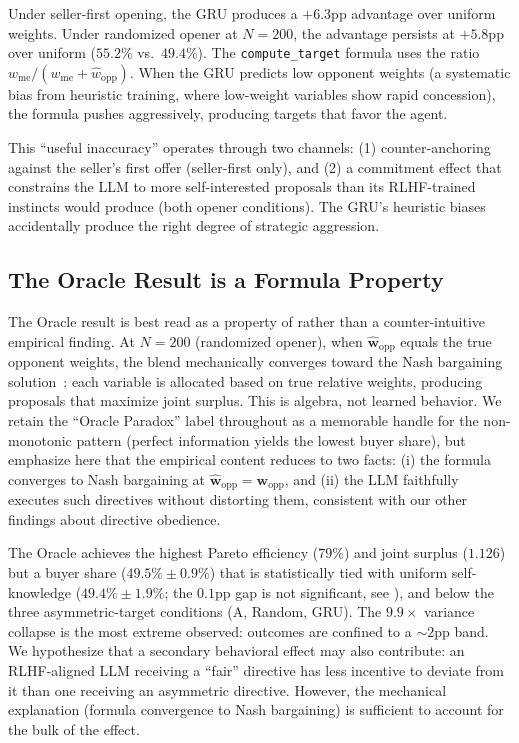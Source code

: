 \documentclass[11pt,a4paper]{article}
\begin{document}
Under seller-first opening, the GRU produces a $+6.3$pp advantage over uniform weights. Under randomized opener at $N = 200$, the advantage persists at $+5.8$pp over uniform ($55.2\%$ vs.\ $49.4\%$). The \texttt{compute\_target} formula uses the ratio $w_{\text{me}} / (w_{\text{me}} + \hat{w}_{\text{opp}})$. When the GRU predicts low opponent weights (a systematic bias from heuristic training, where low-weight variables show rapid concession), the formula pushes aggressively, producing targets that favor the agent.

This ``useful inaccuracy'' operates through two channels: (1) counter-anchoring against the seller's first offer (seller-first only), and (2) a commitment effect that constrains the LLM to more self-interested proposals than its RLHF-trained instincts would produce (both opener conditions). The GRU's heuristic biases accidentally produce the right degree of strategic aggression.

\subsection{The Oracle Result is a Formula Property}
\label{sec:oracle}

The Oracle result is best read as a property of  rather than a counter-intuitive empirical finding. At $N = 200$ (randomized opener), when $\hat{\mathbf{w}}_\text{opp}$ equals the true opponent weights, the blend mechanically converges toward the Nash bargaining solution~\citep{nash1950bargaining}: each variable is allocated based on true relative weights, producing proposals that maximize joint surplus. This is algebra, not learned behavior. We retain the ``Oracle Paradox'' label throughout as a memorable handle for the non-monotonic pattern (perfect information yields the lowest buyer share), but emphasize here that the empirical content reduces to two facts: (i) the formula converges to Nash bargaining at $\hat{\mathbf{w}}_\text{opp} = \mathbf{w}_\text{opp}$, and (ii) the LLM faithfully executes such directives without distorting them, consistent with our other findings about directive obedience.

The Oracle achieves the highest Pareto efficiency ($79\%$) and joint surplus ($1.126$) but a buyer share ($49.5\% \pm 0.9\%$) that is statistically tied with uniform self-knowledge ($49.4\% \pm 1.9\%$; the $0.1$pp gap is not significant, see ), and below the three asymmetric-target conditions (A, Random, GRU). The $9.9\times$ variance collapse is the most extreme observed: outcomes are confined to a ${\sim}2$pp band. We hypothesize that a secondary behavioral effect may also contribute: an RLHF-aligned LLM receiving a ``fair'' directive has less incentive to deviate from it than one receiving an asymmetric directive. However, the mechanical explanation (formula convergence to Nash bargaining) is sufficient to account for the bulk of the effect.
\end{document}
